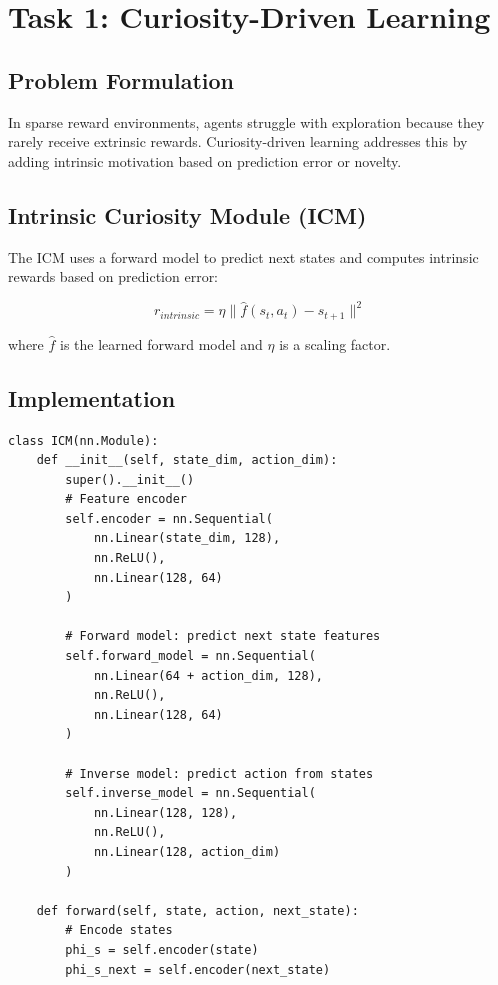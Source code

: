 \documentclass[12pt]{article}
\begin{document}
{{{\section{Task 1: Curiosity-Driven Learning}

\subsection{Problem Formulation}

In sparse reward environments, agents struggle with exploration because they rarely receive extrinsic rewards. Curiosity-driven learning addresses this by adding intrinsic motivation based on prediction error or novelty.

\subsection{Intrinsic Curiosity Module (ICM)}

The ICM uses a forward model to predict next states and computes intrinsic rewards based on prediction error:

\begin{equation}
r_{intrinsic} = \eta \| \hat{f}(s_t, a_t) - s_{t+1} \|^2
\end{equation}

where $\hat{f}$ is the learned forward model and $\eta$ is a scaling factor.

\subsection{Implementation}

\begin{verbatim}
class ICM(nn.Module):
    def __init__(self, state_dim, action_dim):
        super().__init__()
        # Feature encoder
        self.encoder = nn.Sequential(
            nn.Linear(state_dim, 128),
            nn.ReLU(),
            nn.Linear(128, 64)
        )
        
        # Forward model: predict next state features
        self.forward_model = nn.Sequential(
            nn.Linear(64 + action_dim, 128),
            nn.ReLU(),
            nn.Linear(128, 64)
        )
        
        # Inverse model: predict action from states
        self.inverse_model = nn.Sequential(
            nn.Linear(128, 128),
            nn.ReLU(),
            nn.Linear(128, action_dim)
        )
    
    def forward(self, state, action, next_state):
        # Encode states
        phi_s = self.encoder(state)
        phi_s_next = self.encoder(next_state)
        

\end{verbatim}}}}
\end{document}
